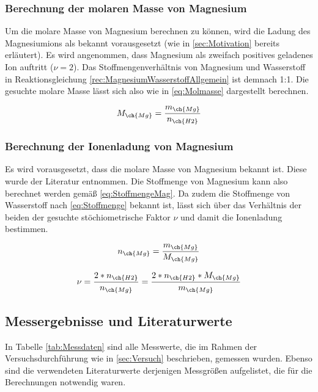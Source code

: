 \documentclass{article}
\begin{document}
      \subsubsection{Berechnung der molaren Masse von Magnesium}
    
        Um die molare Masse von Magnesium berechnen zu können, wird die Ladung des Magnesiumions als bekannt vorausgesetzt (wie in \ref{sec:Motivation} bereits erläutert). Es wird angenommen, dass Magnesium als zweifach positives geladenes Ion auftritt ($\nu = 2$). Das Stoffmengenverhältnis von Magnesium und Wasserstoff in Reaktionsgleichung \ref{rec:MagnesiumWasserstoffAllgemein} ist demnach 1:1. Die gesuchte molare Masse lässt sich also wie in \eqref{eq:Molmasse} dargestellt berechnen.
    
        \begin{equation}
          M_{\ch{Mg}} = \frac{m_{\ch{Mg}}}{n_{\ch{H2}}} \label{eq:Molmasse}
        \end{equation}
    
      \subsubsection{Berechnung der Ionenladung von Magnesium}
    
        Es wird vorausgesetzt, dass die molare Masse von Magnesium bekannt ist. Diese wurde der Literatur entnommen. Die Stoffmenge von Magnesium kann also berechnet werden gemäß \ref{eq:StoffmengeMag}. Da zudem die Stoffmenge von Wasserstoff nach \ref{eq:Stoffmenge} bekannt ist, lässt sich über das Verhältnis der beiden der gesuchte stöchiometrische Faktor $\nu$ und damit die Ionenladung bestimmen.
    
        \begin{equation}
          n_{\ch{Mg}} = \frac{m_{\ch{Mg}}}{M_{\ch{Mg}}} \label{eq:StoffmengeMag} 
        \end{equation}
    
        \begin{equation}
          \nu = \frac{2*n_{\ch{H2}}}{n_{\ch{Mg}}} = \frac{2*n_{\ch{H2}}*M_{\ch{Mg}}}{m_{\ch{Mg}}} \label{eq:nu}
        \end{equation}
      
    \subsection{Messergebnisse und Literaturwerte}
    
      In Tabelle \ref{tab:Messdaten} sind alle Messwerte, die im Rahmen der Versuchsdurchführung wie in \ref{sec:Versuch} beschrieben, gemessen wurden. Ebenso sind die verwendeten Literaturwerte derjenigen Messgrößen aufgelistet, die für die Berechnungen notwendig waren.
      
\end{document}
